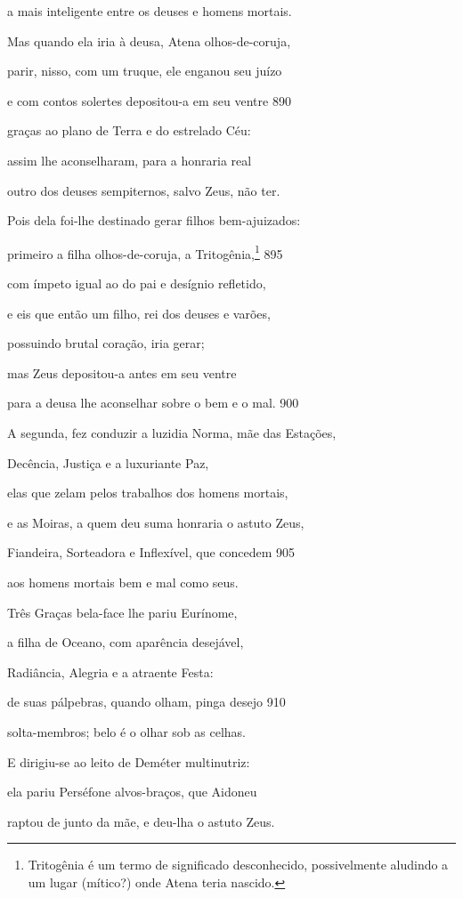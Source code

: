 a mais inteligente entre os deuses e homens mortais.

Mas quando ela iria à deusa, Atena olhos-de-coruja,

parir, nisso, com um truque, ele enganou seu juízo

e com contos solertes depositou-a em seu ventre \num{890}

graças ao plano de Terra e do estrelado Céu:

assim lhe aconselharam, para a honraria real

outro dos deuses sempiternos, salvo Zeus, não ter.

Pois dela foi-lhe destinado gerar filhos bem-ajuizados:

primeiro a filha olhos-de-coruja, a Tritogênia,\footnote{Tritogênia é um termo de significado desconhecido, possivelmente
aludindo a um lugar (mítico?) onde Atena teria nascido.} \num{895}

com ímpeto igual ao do pai e desígnio refletido,

e eis que então um filho, rei dos deuses e varões,

possuindo brutal coração, iria gerar;

mas Zeus depositou-a antes em seu ventre

para a deusa lhe aconselhar sobre o bem e o mal. \num{900}

\quad{}A segunda, fez conduzir a luzidia Norma, mãe das Estações,

Decência, Justiça e a luxuriante Paz,

elas que zelam pelos trabalhos dos homens mortais,

e as Moiras, a quem deu suma honraria o astuto Zeus,

Fiandeira, Sorteadora e Inflexível, que concedem \num{905}

aos homens mortais bem e mal como seus.

\quad{}Três Graças bela-face lhe pariu Eurínome,

a filha de Oceano, com aparência desejável,

Radiância, Alegria e a atraente Festa:

de suas pálpebras, quando olham, pinga desejo \num{910}

solta-membros; belo é o olhar sob as celhas.

\quad{}E dirigiu-se ao leito de Deméter multinutriz:

ela pariu Perséfone alvos-braços, que Aidoneu

raptou de junto da mãe, e deu-lha o astuto Zeus.

